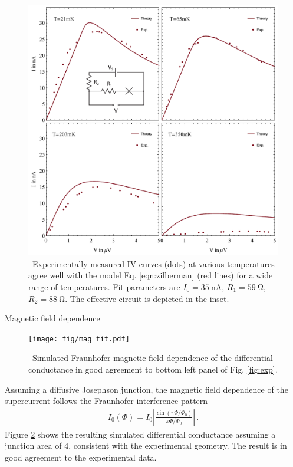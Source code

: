 \documentclass[final]{beamer}
\newlength{\onecolwid}
\begin{document}
\begin{frame}[t]
\begin{columns}[t]
\begin{column}{\onecolwid}
\begin{figure}
	\includegraphics[width=0.93\linewidth]{fig/fig_fit2.pdf}
	\caption{\sffamily \, Experimentally measured IV curves (dots) at various
	temperatures agree well with the model Eq. \ref{eqn:zilberman} (red
	lines) for a
wide range of temperatures. Fit parameters are $I_0=\SI{35}{\nano\ampere}$,
$R_1=\SI{59}{\ohm}$, $R_2=\SI{88}{\ohm}$. The effective circuit is depicted in
the inset.}
\label{fig:fits}
\end{figure}

\begin{block}{Magnetic field dependence}
\begin{figure}
	\texttt{[image: fig/mag\_fit.pdf]}
	\caption{\sffamily \, Simulated Fraunhofer magnetic field dependence of the
	differential conductance in good agreement to bottom left panel of Fig.
\ref{fig:exp}.}
\label{fig:magfit}
\end{figure}

Assuming a diffusive Josephson junction, the magnetic field dependence of the supercurrent follows the Fraunhofer
interference pattern
\begin{eqnarray*}
	I_0(\Phi) = I_0 \left|\frac{\sin(\pi\Phi/\Phi_0)}{\pi\Phi/\Phi_0}\right|
	\,.
\end{eqnarray*}
Figure \ref{fig:magfit} shows the resulting simulated differential conductance assuming a
junction area of 4, consistent with the
experimental geometry. The result is in good agreement to the experimental
data.


\end{block}
\end{column}
\end{columns}
\end{frame}
\end{document}
